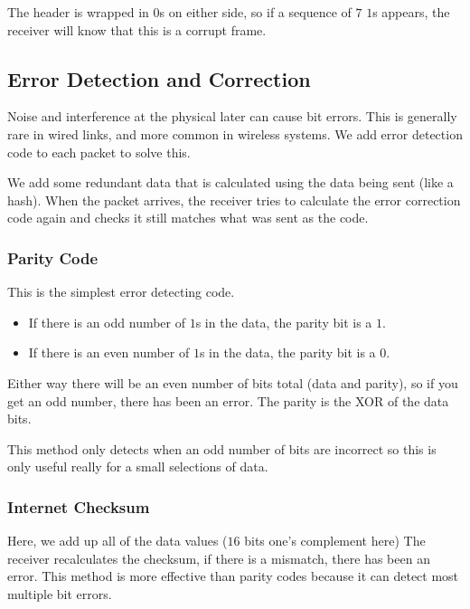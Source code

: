 The header is wrapped in \(0\)s on either side, so if a sequence of \(7\) \(1\)s appears, the receiver will know that this is a corrupt frame.

\subsection{Error Detection and Correction}\label{sub:error_detection_and_correction}

Noise and interference at the physical later can cause bit errors.
This is generally rare in wired links, and more common in wireless systems.
We add error detection code to each packet to solve this.

We add some redundant data that is calculated using the data being sent (like a hash).
When the packet arrives, the receiver tries to calculate the error correction code again and checks it still matches what was sent as the code.

\subsubsection{Parity Code}\label{ssub:parity_code}

This is the simplest error detecting code.
\begin{itemize}
    \item If there is an odd number of \(1\)s in the data, the parity bit is a \(1\).
    \item If there is an even number of \(1\)s in the data, the parity bit is a \(0\).
\end{itemize}
Either way there will be an even number of bits total (data and parity), so if you get an odd number, there has been an error.
The parity is the XOR of the data bits.

\begin{note}
    This method only detects when an odd number of bits are incorrect so this is only useful really for a small selections of data.
\end{note}

\subsubsection{Internet Checksum}\label{ssub:internet_checksum}

Here, we add up all of the data values (\(16\) bits one's complement here)
The receiver recalculates the checksum, if there is a mismatch, there has been an error.
This method is more effective than parity codes because it can detect most multiple bit errors.

